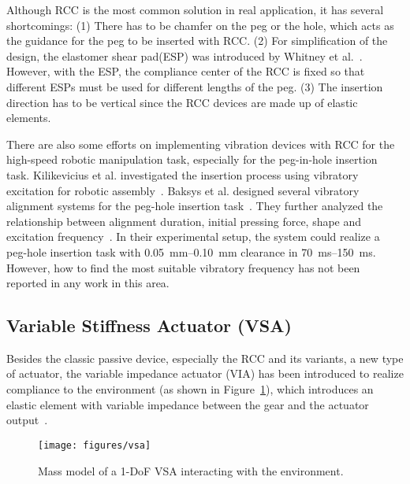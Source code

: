 \documentclass[journal,twoside,web]{ieeecolor}
\begin{document}
Although RCC is the most common solution in real application, it has several shortcomings: 
(1) There has to be chamfer on the peg or the hole, which acts as the guidance for the peg to be inserted with RCC. 
(2) For simplification of the design, the elastomer shear pad(ESP) was introduced by Whitney et al.~\cite{Whitney1986b}. However, with the ESP, the compliance center of the RCC is fixed so that different ESPs must be used for different lengths of the peg. 
(3) The insertion direction has to be vertical since the RCC devices are made up of elastic elements.

There are also some efforts on implementing vibration devices with RCC for the high-speed robotic manipulation task, especially for the peg-in-hole insertion task. 
Kilikevicius et al. investigated the insertion process using vibratory excitation for robotic assembly~\cite{Kilikevicius2007,Kilikevicius2011}. 
Baksys et al. designed several vibratory alignment systems for the peg-hole insertion task~\cite{Baksys2008,Baksys2011}. They further analyzed the relationship between alignment duration, initial pressing force, shape and excitation frequency~\cite{Baksys2010}. 
In their experimental setup, the system could realize a peg-hole insertion task with \SIrange{0.05}{0.10}{\milli\meter} clearance in \SIrange{70}{150}{\milli\second}.
However, how to find the most suitable vibratory frequency has not been reported in any work in this area.

\subsection{Variable Stiffness Actuator (VSA)}
\label{subsec:vsa}

Besides the classic passive device, especially the RCC and its variants, a new type of actuator, the variable impedance actuator (VIA) has been introduced to realize compliance to the environment (as shown in Figure~\ref{fig:vsa}), which introduces an elastic element with variable impedance between the gear and the actuator output~\cite{Wolf2016}.

\begin{figure}[htb]
    \centering
    \texttt{[image: figures/vsa]}
    \caption{Mass model of a 1-DoF VSA interacting with the environment.}
    \label{fig:vsa}
\end{figure}
\end{document}
